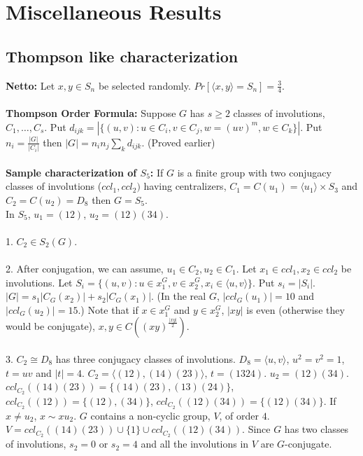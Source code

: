 \chapter{Miscellaneous Results}
\section{Thompson like characterization}
{\bf Netto:}  Let $x,y \in S_n$ be selected randomly.  
$Pr[ \langle x,y \rangle =S_n]= {\frac 3 4}$.  
\\
\\
{\bf Thompson Order Formula:} Suppose $G$ has $s\geq 2$ classes of involutions, $C_1, \ldots , C_s$.
Put $d_{ijk} = |\{ (u,v): u \in C_i, v \in C_j, w=(uv)^m, w \in C_k \}|$.  Put $n_i = {\frac {|G|} {|C_i|}}$ then
$|G| = n_i n_j \sum_k d_{ijk} $. (Proved earlier)
\\
\\
{\bf Sample characterization of $S_5$:}
If $G$ is a finite group with two conjugacy classes of involutions ($ccl_1, ccl_2)$ having
centralizers, $C_1= C(u_1) = \langle u_1 \rangle \times S_3$ and
$C_2= C(u_2) = D_8$ then $G = S_5$.
\\
In $S_5$, $u_1= (12)$, $u_2= (12)(34)$.
\\
\\
1. $C_2 \in S_2(G)$.
\\
\\
2.  After conjugation, we can assume, $u_1 \in C_2, u_2 \in C_1$.
Let $x_1 \in ccl_1, x_2 \in ccl_2$ be involutions.  Let $S_i= \{ (u, v):
u \in x_1^G, v \in x_2^G, x_i \in \langle u, v \rangle \}$. Put $s_i = |S_i|$.
$|G|= s_1|C_G(x_2)| + s_2 |C_G(x_1)|$.
(In the real $G$, $|ccl_G(u_1)| = 10$ and $|ccl_G(u_2)|= 15$.)
Note that if $x \in x_1^G$ and $y \in x_2^G$, $|xy|$ is even (otherwise they would be
conjugate), $x,y \in C((xy)^{\frac {|xy|} 2})$.
\\
\\
3. 
$C_2 \cong D_8$ has three conjugacy classes of involutions.  
$D_8= \langle u, v \rangle $, $u^2=v^2=1$, $t= uv$ and $|t| = 4$.
$C_2= \langle (12),(14)(23) \rangle $, $t= (1324)$.
$u_2= (12)(34)$.
$ccl_{C_2}((14)(23))= \{ (14)(23), (13)(24) \}$,
$ccl_{C_2}((12))= \{ (12), (34) \}$,
$ccl_{C_2}((12)(34))= \{ (12)(34) \}$.  If $x \ne u_2$, $ x \sim x u_2$.
$G$ contains a non-cyclic group, $V$, of order $4$.
$V= ccl_{C_2}((14)(23)) \cup \{ 1 \} \cup ccl_{C_2}((12)(34))$.
Since $G$ has two classes of involutions, $s_2 = 0$ or $s_2 = 4$ and all the
involutions in $V$ are $G$-conjugate.
\\
